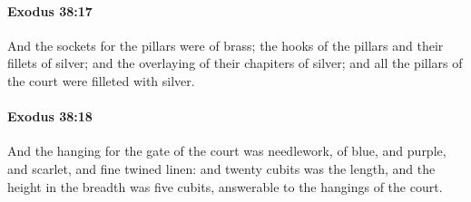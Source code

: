 		\paragraph{Exodus 38:17} %
			\label{EXODUS-38-17}

			And the sockets for the pillars were of brass; the hooks of the pillars and their fillets of silver; and the overlaying of their chapiters of silver; and all the pillars of the court were filleted with silver.


		\paragraph{Exodus 38:18} %
			\label{EXODUS-38-18}

			And the hanging for the gate of the court was needlework, of blue, and purple, and scarlet, and fine twined linen: and twenty cubits was the length, and the height in the breadth was five cubits, answerable to the hangings of the court.

